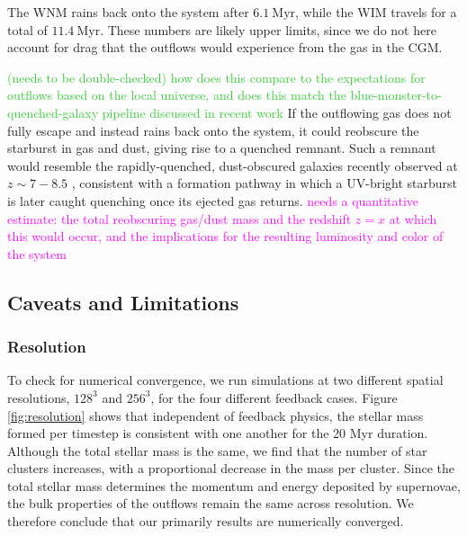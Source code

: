 \documentclass[twocolumn,linenumbers]{aastex631}
\begin{document}
The WNM rains back onto the system after $6.1\ \mathrm{Myr}$, while the WIM travels for a total of $11.4\ \mathrm{Myr}$. These numbers are likely upper limits, since we do not here account for drag that the outflows would experience from the gas in the CGM.

\textcolor{limegreen}{(needs to be double-checked) how does this compare to the expectations for outflows based on the local universe, and does this match the blue-monster-to-quenched-galaxy pipeline discussed in recent work}
If the outflowing gas does not fully escape and instead rains back onto the system, it could reobscure the starburst in gas and dust, giving rise to a quenched remnant. Such a remnant would resemble the rapidly-quenched, dust-obscured galaxies recently observed at $z\sim7-8.5$ \citep{2025A&A...697A..90B,2025arXiv251212813H}, consistent with a formation pathway in which a UV-bright starburst is later caught quenching once its ejected gas returns. \textcolor{magenta}{needs a quantitative estimate: the total reobscuring gas/dust mass and the redshift $z=x$ at which this would occur, and the implications for the resulting luminosity and color of the system}


\subsection{Caveats and Limitations}\label{sec:caveats}
\subsubsection{Resolution}
To check for numerical convergence, we run simulations at two different spatial resolutions, $128^3$ and $256^3$, for the four different feedback cases. Figure \ref{fig:resolution} shows that independent of feedback physics,  the stellar mass formed per timestep is consistent with one another for the 20 Myr duration. Although the total stellar mass is the same, we find that the number of star clusters increases, with a proportional decrease in the mass per cluster. Since the total stellar mass determines the momentum and energy deposited by supernovae, the bulk properties of the outflows remain the same across resolution. We therefore conclude that our primarily results are numerically converged.
\end{document}
